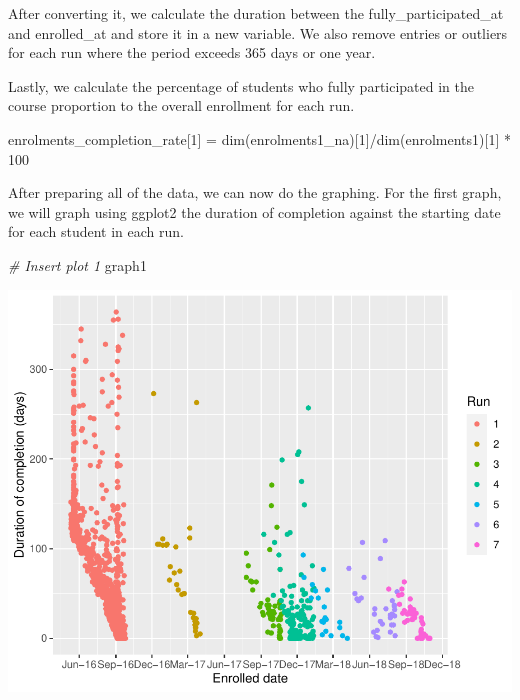 \documentclass[12pt,]{article}
\newenvironment{Shaded}{\begin{snugshade}}{\end{snugshade}}
\newcommand{\CommentTok}[1]{\textcolor[rgb]{0.56,0.35,0.01}{\textit{#1}}}
\newcommand{\DecValTok}[1]{\textcolor[rgb]{0.00,0.00,0.81}{#1}}
\newcommand{\FunctionTok}[1]{\textcolor[rgb]{0.00,0.00,0.00}{#1}}
\newcommand{\NormalTok}[1]{#1}
\newcommand{\OtherTok}[1]{\textcolor[rgb]{0.56,0.35,0.01}{#1}}
\newcommand{\SpecialCharTok}[1]{\textcolor[rgb]{0.00,0.00,0.00}{#1}}
\begin{document}
After converting it, we calculate the duration between the
fully\_participated\_at and enrolled\_at and store it in a new variable.
We also remove entries or outliers for each run where the period exceeds
365 days or one year.

\begin{Shaded}
\end{Shaded}

Lastly, we calculate the percentage of students who fully participated
in the course proportion to the overall enrollment for each run.

\begin{Shaded}
\begin{Highlighting}[]
\NormalTok{enrolments\_completion\_rate[}\DecValTok{1}\NormalTok{] }\OtherTok{=} 
  \FunctionTok{dim}\NormalTok{(enrolments1\_na)[}\DecValTok{1}\NormalTok{]}\SpecialCharTok{/}\FunctionTok{dim}\NormalTok{(enrolments1)[}\DecValTok{1}\NormalTok{] }\SpecialCharTok{*} \DecValTok{100}
\end{Highlighting}
\end{Shaded}

After preparing all of the data, we can now do the graphing. For the
first graph, we will graph using ggplot2 the duration of completion
against the starting date for each student in each run.

\begin{Shaded}
\begin{Highlighting}[]
\CommentTok{\# Insert plot 1}
\NormalTok{graph1}
\end{Highlighting}
\end{Shaded}

\begin{center}\includegraphics{report_files/figure-latex/unnamed-chunk-7-1} \end{center}
\end{document}
